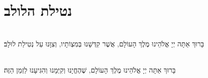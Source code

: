\documentclass[twoside, openany, parskip=half, 11pt]{book}
\begin{document}
\shabbossimshalom

\tachanunim


\\
\\

\section[נטילת הלולב]{ נטילת הלולב }
\label{lulav}
\\
בָּרוּךְ אַתָּה יְיָ אֱלֹהֵינוּ מֶלֶךְ הָעוֹלָם, אֲשֶׁר קִדְּשָׁנוּ בְּמִצְוֹתָיו, וְצִוָּנוּ עַל נְטִילַת לוּלָב׃



\\
בָּרוּךְ אַתָּה יְיָ אֱלֹהֵינוּ מֶלֶךְ הָעוֹלָם, שֶׁהֶחֱיָנוּ וְקִיְּמָנוּ וְהִגִּיעָנוּ לַזְמַן הַזֶּה׃
\end{document}
